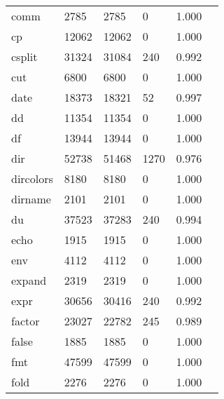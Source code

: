 \begin{longtable}{lp{2.20cm}p{2.20cm}p{2.20cm}p{2.20cm}p{2.20cm}}
comm      &                     2785 &         2785 &             0 &                    1.000 \\
cp        &                    12062 &        12062 &             0 &                    1.000 \\
csplit    &                    31324 &        31084 &           240 &                    0.992 \\
cut       &                     6800 &         6800 &             0 &                    1.000 \\
date      &                    18373 &        18321 &            52 &                    0.997 \\
dd        &                    11354 &        11354 &             0 &                    1.000 \\
df        &                    13944 &        13944 &             0 &                    1.000 \\
dir       &                    52738 &        51468 &          1270 &                    0.976 \\
dircolors &                     8180 &         8180 &             0 &                    1.000 \\
dirname   &                     2101 &         2101 &             0 &                    1.000 \\
du        &                    37523 &        37283 &           240 &                    0.994 \\
echo      &                     1915 &         1915 &             0 &                    1.000 \\
env       &                     4112 &         4112 &             0 &                    1.000 \\
expand    &                     2319 &         2319 &             0 &                    1.000 \\
expr      &                    30656 &        30416 &           240 &                    0.992 \\
factor    &                    23027 &        22782 &           245 &                    0.989 \\
false     &                     1885 &         1885 &             0 &                    1.000 \\
fmt       &                    47599 &        47599 &             0 &                    1.000 \\
fold      &                     2276 &         2276 &             0 &                    1.000 \\

\end{longtable}

